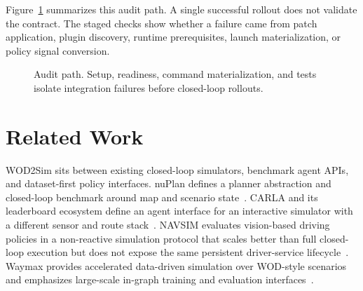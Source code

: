 \documentclass{article}
\begin{document}
Figure~\ref{fig:artifact_path} summarizes this audit path. A single successful rollout
does not validate the contract. The staged checks show whether a failure came from patch
application, plugin discovery, runtime prerequisites, launch materialization, or policy
signal conversion.

\begin{figure}[t]
\centering
{}
\caption{Audit path. Setup, readiness, command materialization, and tests isolate
integration failures before closed-loop rollouts.}
\label{fig:artifact_path}
\end{figure}

\section{Related Work}

WOD2Sim sits between existing closed-loop simulators, benchmark agent APIs, and
dataset-first policy interfaces. nuPlan defines a planner abstraction and closed-loop
benchmark around map and scenario state~\citep{caesar2021nuplan}. CARLA and its
leaderboard ecosystem define an agent interface for an interactive simulator with a
different sensor and route stack~\citep{dosovitskiy2017carla}. NAVSIM evaluates
vision-based driving policies in a non-reactive simulation protocol that scales better
than full closed-loop execution but does not expose the same persistent driver-service
lifecycle~\citep{dauner2024navsim}. Waymax provides accelerated data-driven simulation
over WOD-style scenarios and emphasizes large-scale in-graph training and evaluation
interfaces~\citep{gulino2023waymax}.
\end{document}
